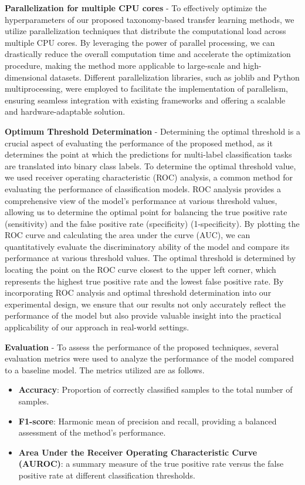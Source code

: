 \textbf{Parallelization for multiple CPU cores} - To effectively optimize the hyperparameters of our proposed taxonomy-based transfer learning methods, we utilize parallelization techniques that distribute the computational load across multiple CPU cores. By leveraging the power of parallel processing, we can drastically reduce the overall computation time and accelerate the optimization procedure, making the method more applicable to large-scale and high-dimensional datasets. Different parallelization libraries, such as joblib and Python multiprocessing, were employed to facilitate the implementation of parallelism, ensuring seamless integration with existing frameworks and offering a scalable and hardware-adaptable solution.

\textbf{Optimum Threshold Determination} - Determining the optimal threshold is a crucial aspect of evaluating the performance of the proposed method, as it determines the point at which the predictions for multi-label classification tasks are translated into binary class labels. To determine the optimal threshold value, we used receiver operating characteristic (ROC) analysis, a common method for evaluating the performance of classification models. ROC analysis provides a comprehensive view of the model's performance at various threshold values, allowing us to determine the optimal point for balancing the true positive rate (sensitivity) and the false positive rate (specificity) (1-specificity). By plotting the ROC curve and calculating the area under the curve (AUC), we can quantitatively evaluate the discriminatory ability of the model and compare its performance at various threshold values. The optimal threshold is determined by locating the point on the ROC curve closest to the upper left corner, which represents the highest true positive rate and the lowest false positive rate. By incorporating ROC analysis and optimal threshold determination into our experimental design, we ensure that our results not only accurately reflect the performance of the model but also provide valuable insight into the practical applicability of our approach in real-world settings.

\textbf{Evaluation} - To assess the performance of the proposed techniques, several evaluation metrics were used to analyze the performance of the model compared to a baseline model. The metrics utilized are as follows.
\begin{itemize}
    \item \textbf{Accuracy}: Proportion of correctly classified samples to the total number of samples.
    \item \textbf{F1-score}: Harmonic mean of precision and recall, providing a balanced assessment of the method's performance.
    \item \textbf{Area Under the Receiver Operating Characteristic Curve (AUROC)}: a summary measure of the true positive rate versus the false positive rate at different classification thresholds.
\end{itemize}

